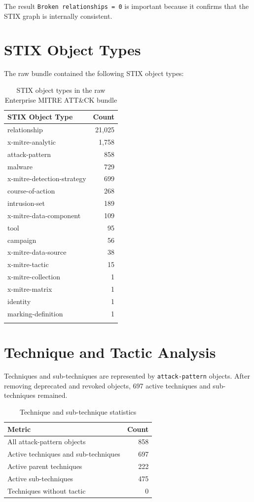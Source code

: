 \documentclass[12pt,a4paper]{report}
\newcommand{\ATTACK}{MITRE ATT\&CK}
\begin{document}
The result \texttt{Broken relationships = 0} is important because it confirms that the STIX graph is internally consistent.

\section{STIX Object Types}

The raw bundle contained the following STIX object types:

\begin{longtable}{lr}
\toprule
\textbf{STIX Object Type} & \textbf{Count} \\
\midrule
\endhead
relationship & 21,025 \\
x-mitre-analytic & 1,758 \\
attack-pattern & 858 \\
malware & 729 \\
x-mitre-detection-strategy & 699 \\
course-of-action & 268 \\
intrusion-set & 189 \\
x-mitre-data-component & 109 \\
tool & 95 \\
campaign & 56 \\
x-mitre-data-source & 38 \\
x-mitre-tactic & 15 \\
x-mitre-collection & 1 \\
x-mitre-matrix & 1 \\
identity & 1 \\
marking-definition & 1 \\
\bottomrule
\caption{STIX object types in the raw Enterprise \ATTACK{} bundle}
\end{longtable}

\section{Technique and Tactic Analysis}

Techniques and sub-techniques are represented by \texttt{attack-pattern} objects. After removing deprecated and revoked objects, 697 active techniques and sub-techniques remained.

\begin{table}[H]
\centering
\begin{tabular}{lr}
\toprule
\textbf{Metric} & \textbf{Count} \\
\midrule
All attack-pattern objects & 858 \\
Active techniques and sub-techniques & 697 \\
Active parent techniques & 222 \\
Active sub-techniques & 475 \\
Techniques without tactic & 0 \\
\bottomrule
\end{tabular}
\caption{Technique and sub-technique statistics}
\end{table}
\end{document}
